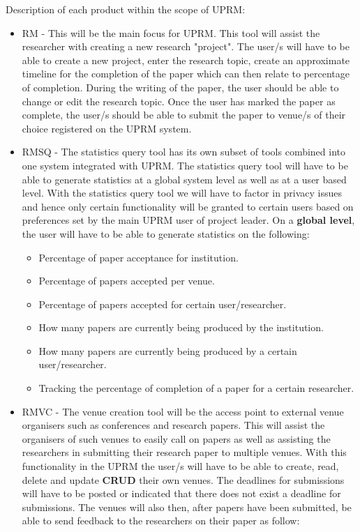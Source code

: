 		\begin{paragraph}{}
			Description of each product within the scope of UPRM:
				\begin{itemize}
					\item RM -
						This will be the main focus for UPRM. This tool will assist the researcher with creating a new research "project". 
						The user/s will have to be able to create a new project, enter the research topic, create an approximate timeline for the completion of the paper which can then relate to percentage of completion. During the writing of the paper, the user should be able to change or edit the research topic. Once the user has marked the paper as complete, the user/s should be able to submit the paper to venue/s of their choice registered on the UPRM system.
					\item RMSQ -
						The statistics query tool has its own subset of tools combined into one system integrated with UPRM. The statistics query tool will have to be able to generate statistics at a global system level as well as at a user based level. With the statistics query tool we will have to factor in privacy issues and hence only certain functionality will be granted to certain users based on preferences set by the main UPRM user of project leader. On a \textbf{global level}, the user will have to be able to generate statistics on the following: 
							\begin{itemize}
								\item Percentage of paper acceptance for institution.
								\item Percentage of papers accepted per venue.
								\item Percentage of papers accepted for certain user/researcher.
								\item How many papers are currently being produced by the institution.
								\item How many papers are currently being produced by a certain user/researcher.
								\item Tracking the percentage of completion of a paper for a certain researcher.
							\end{itemize}
					\item RMVC -
						The venue creation tool will be the access point to external venue organisers such as conferences and research papers. This will assist the organisers of such venues to easily call on papers as well as assisting the researchers in submitting their research paper to multiple venues. With this functionality in the UPRM the user/s will have to be able to create, read, delete and update \textbf{CRUD} their own venues. The deadlines for submissions will have to be posted or indicated that there does not exist a deadline for submissions. The venues will also then, after papers have been submitted, be able to send feedback to the researchers on their paper as follow:

\end{itemize}
\end{paragraph}
